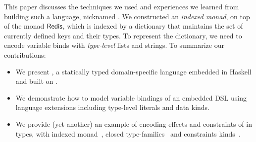 This paper discusses the techniques we used and experiences we learned from building such a language, nicknamed \Edis{}. We constructed an {\em indexed
monad}, on top of the monad \ensuremath{\Conid{Redis}}, which is indexed by a dictionary that
maintains the set of currently defined keys and their types. To represent
the dictionary, we need to encode variable binds with {\em type-level} lists
and strings. To summarize our contributions:
\begin{itemize}
\item We present \Edis{}, a statically typed domain-specific language embedded in Haskell and built on \Hedis{}.
%
\item We demonstrate how to model variable bindings of an embedded DSL using
 language extensions including type-level literals and data kinds.
%
\item We provide (yet another) an example of encoding effects and constraints of
in types, with indexed monad~\cite{indexedmonad}, closed type-families~\cite{closedtypefamilies} and constraints kinds~\cite{constraintskinds}.
\end{itemize}
